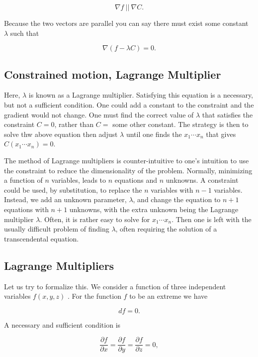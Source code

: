 \documentclass[%
oneside,                 %
final,                   %
10pt]{article}
\begin{document}
\begin{equation}
\nabla f ~||~ \nabla C.
\end{equation}

Because the two vectors are parallel you can say there must exist some
constant $\lambda$ such that

\begin{equation}
\nabla(f-\lambda C)=0.
\end{equation}

\subsection*{Constrained motion, Lagrange Multiplier}

Here, $\lambda$ is known as a Lagrange multiplier. Satisfying
this equation  is a necessary, but not a sufficient
condition. One could add a constant to the constraint and the gradient
would not change. One must find the correct value of $\lambda$ that
satisfies the constraint $C=0$, rather than $C=$ some other
constant. The strategy is then to solve
thw above equation  then adjust $\lambda$ until one
finds the $x_1\cdots x_n$ that gives $C(x_1\cdots x_n)=0$.

The method of Lagrange multipliers is counter-intuitive to one's
intuition to use the constraint to reduce the dimensionality of the
problem. Normally, minimizing a function of $n$ variables, leads to
$n$ equations and $n$ unknowns. A constraint could be used, by
substitution, to replace the $n$ variables with $n-1$
variables. Instead, we add an unknown parameter, $\lambda$, and change
the equation to $n+1$ equations with $n+1$ unknowns, with the extra
unknown being the Lagrange multiplier $\lambda$. Often, it is rather
easy to solve for $x_1\cdots x_n$. Then one is left with the usually
difficult problem of finding $\lambda$, often requiring the solution
of a transcendental equation.

\subsection*{Lagrange Multipliers}

Let us try to formalize this. We consider a function of three independent variables $f(x,y,z)$ . For
the function $f$ to be an extreme we have

\[
df=0.
\]

A necessary and sufficient condition is

\[
\frac{\partial f}{\partial x} =\frac{\partial f}{\partial y}=\frac{\partial f}{\partial z}=0,
\]
\end{document}
